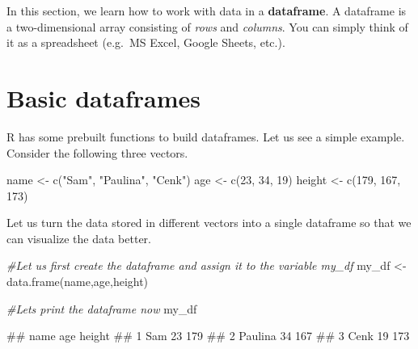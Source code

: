 \documentclass[
]{book}
\newenvironment{Shaded}{\begin{snugshade}}{\end{snugshade}}
\newcommand{\CommentTok}[1]{\textcolor[rgb]{0.56,0.35,0.01}{\textit{#1}}}
\newcommand{\DecValTok}[1]{\textcolor[rgb]{0.00,0.00,0.81}{#1}}
\newcommand{\FunctionTok}[1]{\textcolor[rgb]{0.00,0.00,0.00}{#1}}
\newcommand{\NormalTok}[1]{#1}
\newcommand{\OtherTok}[1]{\textcolor[rgb]{0.56,0.35,0.01}{#1}}
\newcommand{\StringTok}[1]{\textcolor[rgb]{0.31,0.60,0.02}{#1}}
\begin{document}
In this section, we learn how to work with data in a \textbf{dataframe}. A dataframe is a two-dimensional array consisting of \emph{rows} and \emph{columns}. You can simply think of it as a spreadsheet (e.g.~MS Excel, Google Sheets, etc.).

\hypertarget{basic-dataframes}{%
\section{Basic dataframes}\label{basic-dataframes}}

R has some prebuilt functions to build dataframes. Let us see a simple example. Consider the following three vectors.

\begin{Shaded}
\begin{Highlighting}[]
\NormalTok{name }\OtherTok{\textless{}{-}} \FunctionTok{c}\NormalTok{(}\StringTok{"Sam"}\NormalTok{, }\StringTok{"Paulina"}\NormalTok{, }\StringTok{"Cenk"}\NormalTok{)}
\NormalTok{age }\OtherTok{\textless{}{-}} \FunctionTok{c}\NormalTok{(}\DecValTok{23}\NormalTok{, }\DecValTok{34}\NormalTok{, }\DecValTok{19}\NormalTok{)}
\NormalTok{height }\OtherTok{\textless{}{-}} \FunctionTok{c}\NormalTok{(}\DecValTok{179}\NormalTok{, }\DecValTok{167}\NormalTok{, }\DecValTok{173}\NormalTok{)}
\end{Highlighting}
\end{Shaded}

Let us turn the data stored in different vectors into a single dataframe so that we can visualize the data better.

\begin{Shaded}
\begin{Highlighting}[]
\CommentTok{\#Let us first create the dataframe and assign it to the variable my\_df}
\NormalTok{my\_df }\OtherTok{\textless{}{-}} \FunctionTok{data.frame}\NormalTok{(name,age,height)}

\CommentTok{\#Let\textquotesingle{}s print the dataframe now}
\NormalTok{my\_df}
\end{Highlighting}
\end{Shaded}

\begin{Shaded}
\begin{Highlighting}[]
\NormalTok{\#\#      name age height}
\NormalTok{\#\# 1     Sam  23    179}
\NormalTok{\#\# 2 Paulina  34    167}
\NormalTok{\#\# 3    Cenk  19    173}
\end{Highlighting}
\end{Shaded}
\end{document}
